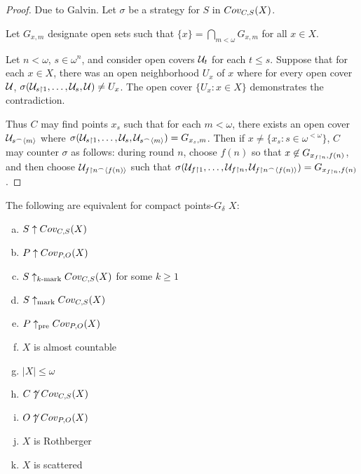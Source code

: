   \begin{proof}

    Due to Galvin. Let $\sigma$ be a strategy for $S$ in $Cov_{C,S}(X)$.

    Let $G_{x,m}$ designate open sets such that $\{x\}=\bigcap_{m<\omega}G_{x,m}$ for all $x\in X$.

    Let $n<\omega$, $s\in\omega^{n}$, and consider open covers $\mathcal{U}_t$ for each $t\leq s$. Suppose that for each $x\in X$, there was an open neighborhood $U_x$ of $x$ where for every open cover $\mathcal{U}$, $\sigma(\mathcal{U}_{s\restriction 1},\dots,\mathcal{U}_{s},\mathcal{U})\not=U_x$. The open cover $\{U_x : x\in X\}$ demonstrates the contradiction.

    Thus $C$ may find points $x_s$ such that for each $m<\omega$, there exists an open cover $\mathcal{U}_{s^\frown\langle m\rangle}$ where $\sigma(\mathcal{U}_{s\restriction 1},\dots,\mathcal{U}_{s},\mathcal{U}_{s^\frown\langle m\rangle})=G_{x_s,m}$. Then if $x\not=\{x_s : s\in\omega^{<\omega}\}$, $C$ may counter $\sigma$ as follows: during round $n$, choose $f(n)$ so that $x\not\in G_{x_{f\restriction n},f(n)}$, and then choose $\mathcal{U}_{f\restriction n^\frown\langle f(n)\rangle}$ such that $\sigma(\mathcal{U}_{f\restriction 1},\dots,\mathcal{U}_{f\restriction n},\mathcal{U}_{f\restriction n^\frown\langle f(n)\rangle})=G_{x_{f\restriction n},f(n)}$.
  \end{proof} 

  \begin{corollary}
    The following are equivalent for compact points-$G_\delta$ $X$:
      \begin{enumerate}[(a)]
        \item $S\uparrow Cov_{C,S}(X)$
        \item $P\uparrow Cov_{P,O}(X)$
        \item $S\uparrow_{k\text{-mark}}Cov_{C,S}(X)$ for some $k\geq 1$
        \item $S\uparrow_{\text{mark}}Cov_{C,S}(X)$
        \item $P\uparrow_{\text{pre}}Cov_{P,O}(X)$
        \item $X$ is almost countable
        \item $|X|\leq\omega$
        \item $C\not\uparrow Cov_{C,S}(X)$
        \item $O\not\uparrow Cov_{P,O}(X)$
        \item $X$ is Rothberger
        \item $X$ is scattered
      \end{enumerate}
  \end{corollary}

